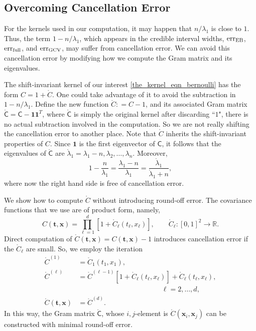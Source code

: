 \documentclass[twocolumn]{svjour3}          %
\newcommand{\bm}[1]{\boldsymbol{#1}}
\newcommand{\reals}{\mathbb{R}}
\newcommand{\rC}{\mathring{C}}
\newcommand{\rlambda}{\mathring{\lambda}}
\newcommand{\vt}{\bm{t}}
\newcommand{\vx}{\bm{x}}
\newcommand{\vone}{\bm{1}}
\newcommand{\mC}{\mathsf{C}}
\newcommand{\rmC}{\mathring{\mathsf{C}}}
\newcommand{\MLE}{\textup{EB}}
\newcommand{\err}{\textup{err}}
\begin{document}
\subsection{Overcoming Cancellation Error}
For the kernels used in our computation, it may happen that $n/\lambda_1$ is close to $1$.  Thus, the term $1-n/\lambda_1$, which appears in the credible interval widths, $\err_{\MLE}$, $\err_{\textup{full}}$, and $\err_{\textup{GCV}}$, may suffer from cancellation error.  We can avoid this cancellation error by modifying how we compute the Gram matrix and its eigenvalues.

The shift-invariant kernel of our interest \eqref{the_kernel_eqn_bernoulli} has the form $C = 1 + \rC$. 
One could take advantage of it to avoid the subtraction in $1-n/\lambda_1$. 
Define the new function $\rC : = C -1$, and its associated Gram matrix $\rmC = \mC - \vone \vone^T$, where $\rmC$ is simply the original kernel after discarding ``$1$", there is no actual subtraction involved in the computation.  So we are not really shifting the cancellation error to another place.
Note that $\rC$ inherits the shift-invariant properties of $C$.  
Since $\vone$ is the first eigenvector of $\mC$, it follows that the eigenvalues of $\rmC$ are $\rlambda_1 = \lambda_1 - n, \lambda_2, \ldots, \lambda_n$.  Moreover,
\begin{equation*}
1 - \frac{n}{\lambda_1}  = \frac{\lambda_1 - n}{\lambda_1} = \frac{\rlambda_1}{\rlambda_1 +n},
\end{equation*}
where now the right hand side is free of cancellation error.

We show how to compute $\rC$ without introducing round-off error.  The covariance functions that we use are of product form, namely,
\begin{equation*}
C(\vt, \vx) = \prod_{\ell=1}^d \left[1 + \rC_\ell(t_\ell,x_\ell) \right], \qquad  \rC_\ell:[0,1]^2 \to \reals.
\end{equation*}
Direct computation of $\rC (\vt,\vx) = C(\vt,\vx) -1$ introduces cancellation error if the $ \rC_\ell$ are small.  So, we employ the iteration
\begin{align*}
\rC^{(1)} &= \rC_1(t_1,x_1),  \\
\rC^{(\ell)} &  = \rC^{(\ell-1)}[1 + \rC_\ell(t_\ell,x_\ell)] + \rC_\ell(t_\ell,x_\ell), \\
& \hspace{5cm} \ell = 2, \ldots, d, \\
\rC(\vt,\vx)  & = \rC^{(d)}.
\end{align*}
In this way, the Gram matrix $\rmC$, whose $i,j$-element is $\rC(\vx_i,\vx_j)$ can be constructed with minimal round-off error.
\end{document}

